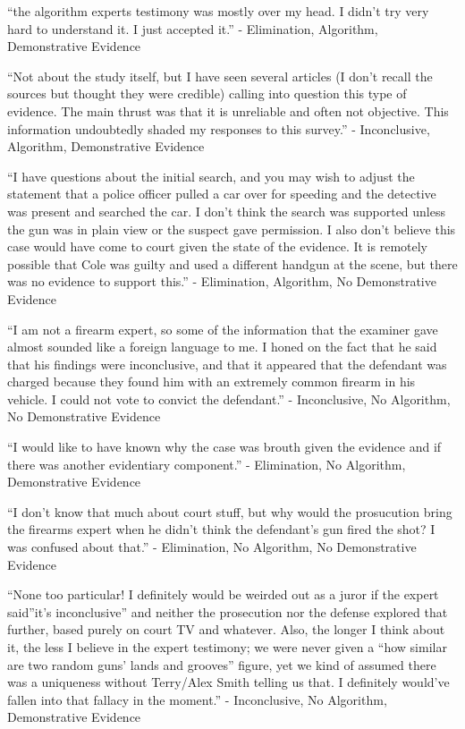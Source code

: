 \documentclass[print]{nuthesis}
\begin{document}
``the algorithm experts testimony was mostly over my head. I didn't try very hard to understand it. I just accepted it.'' - Elimination, Algorithm, Demonstrative Evidence

``Not about the study itself, but I have seen several articles (I don't recall the sources but thought they were credible) calling into question this type of evidence. The main thrust was that it is unreliable and often not objective. This information undoubtedly shaded my responses to this survey.'' - Inconclusive, Algorithm, Demonstrative Evidence

``I have questions about the initial search, and you may wish to adjust the statement that a police officer pulled a car over for speeding and the detective was present and searched the car. I don't think the search was supported unless the gun was in plain view or the suspect gave permission. I also don't believe this case would have come to court given the state of the evidence. It is remotely possible that Cole was guilty and used a different handgun at the scene, but there was no evidence to support this.'' - Elimination, Algorithm, No Demonstrative Evidence

``I am not a firearm expert, so some of the information that the examiner gave almost sounded like a foreign language to me. I honed on the fact that he said that his findings were inconclusive, and that it appeared that the defendant was charged because they found him with an extremely common firearm in his vehicle. I could not vote to convict the defendant.'' - Inconclusive, No Algorithm, No Demonstrative Evidence

``I would like to have known why the case was brouth given the evidence and if there was another evidentiary component.'' - Elimination, No Algorithm, Demonstrative Evidence

``I don't know that much about court stuff, but why would the prosucution bring the firearms expert when he didn't think the defendant's gun fired the shot? I was confused about that.'' - Elimination, No Algorithm, No Demonstrative Evidence

``None too particular! I definitely would be weirded out as a juror if the expert said''it's inconclusive'' and neither the prosecution nor the defense explored that further, based purely on court TV and whatever. Also, the longer I think about it, the less I believe in the expert testimony; we were never given a ``how similar are two random guns' lands and grooves'' figure, yet we kind of assumed there was a uniqueness without Terry/Alex Smith telling us that. I definitely would've fallen into that fallacy in the moment.'' - Inconclusive, No Algorithm, Demonstrative Evidence
\end{document}
